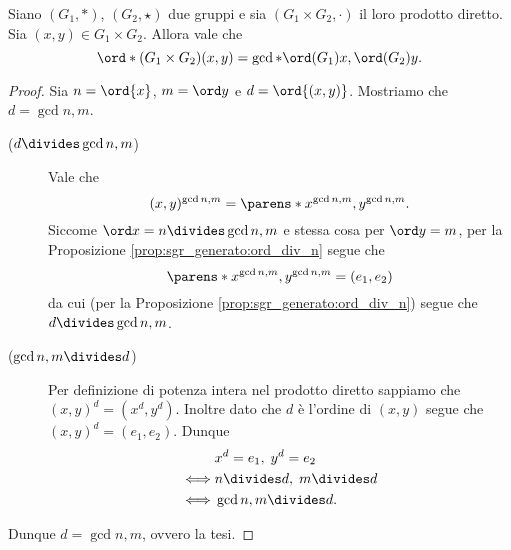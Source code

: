 \begin{proposition}
    \label{prop:ord_prod_diretto}
    Siano $(G_1, *)$, $(G_2, \star)$ due gruppi e sia $(G_1 \times G_2, \cdot)$ il loro prodotto diretto. Sia $(x, y) \in G_1 \times G_2$. Allora vale che \[
        \ord*(G_1 \times G_2){(x, y)} = \gcd*{\ord(G_1){x}, \ord(G_2){y}}.    
    \]
\end{proposition}
\begin{proof}
    Sia $n = \ord{x}$, $m = \ord y$ e $d = \ord{(x, y)}$. Mostriamo che $d = \gcd{n, m}$.
    \begin{description}
        \item[($d \divides \gcd{n, m}$)] Vale che \[
            (x, y)^{\gcd{n, m}} = \parens*{x^{\gcd{n, m}}, y^{\gcd{n, m}}}.   
        \] Siccome $\ord x = n \divides \gcd{n, m}$ e stessa cosa per $\ord y = m$, per la Proposizione \ref{prop:sgr_generato:ord_div_n} segue che \begin{equation*}
            \parens*{x^{\gcd{n, m}}, y^{\gcd{n, m}}} = (e_1, e_2)
        \end{equation*}
        da cui (per la Proposizione \ref{prop:sgr_generato:ord_div_n}) segue che $d \divides \gcd{n, m}$.
        \item[($\gcd{n, m} \divides d$)] Per definizione di potenza intera nel prodotto diretto sappiamo che $(x, y)^d = (x^d, y^d)$. Inoltre dato che $d$ è l'ordine di $(x, y)$ segue che $(x, y)^d = (e_1, e_2)$. Dunque \begin{align*}
            &x^d = e_1, \; y^d = e_2\\
            \iff &n \divides d, \; m \divides d \\
            \iff &\gcd{n, m} \divides d.
        \end{align*}
    \end{description}
    Dunque $d = \gcd{n, m}$, ovvero la tesi.
\end{proof}


